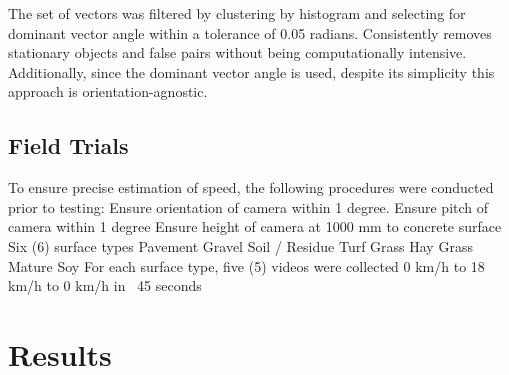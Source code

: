 The set of vectors was filtered by clustering by histogram and
selecting for dominant vector angle within a tolerance of 0.05
radians. Consistently removes stationary objects and false pairs
without being computationally intensive. Additionally, since the
dominant vector angle is used, despite its simplicity this approach is
orientation-agnostic.

\subsection{Field Trials}
To ensure precise estimation of speed, the following procedures were conducted prior to testing:
Ensure orientation of camera within 1 degree.
Ensure pitch of camera within 1 degree
Ensure height of camera at 1000 mm to concrete surface
Six (6) surface types
Pavement
Gravel
Soil / Residue
Turf Grass
Hay Grass
Mature Soy
For each surface type, five (5) videos were collected
0 km/h to 18 km/h to 0 km/h in ~45 seconds

\begin{table}[h]
  \centering
  \caption{RMSE and 95$^{th}$ Percentile
    with respect to crop-stage.} 
  \label{table:trials}
\end{table}

\section{Results}

